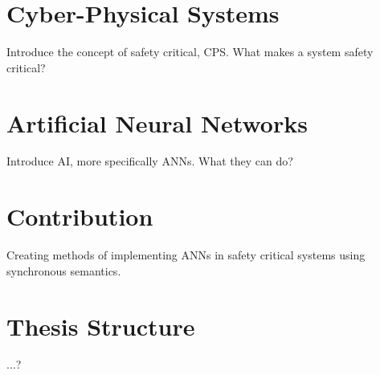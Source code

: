 \section{Cyber-Physical Systems}
Introduce the concept of safety critical, CPS. What makes a system safety critical?

\section{Artificial Neural Networks}
Introduce AI, more specifically ANNs. What they can do?


\section{Contribution}
Creating methods of implementing ANNs in safety critical systems using synchronous semantics.

\section{Thesis Structure}
...?
